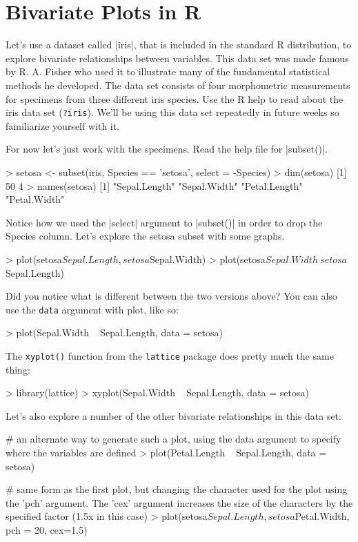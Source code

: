 \section{Bivariate Plots in R}


Let's use a dataset called |iris|, that is included in the standard R distribution, to explore bivariate relationships between variables. This data set was made famous by R. A. Fisher who used it to illustrate many of the fundamental statistical methods he developed. The data set consists of four morphometric measurements for specimens from three different iris species. Use the R help to read about the iris data set (\lstinline!?iris!). We'll be using this data set repeatedly in future weeks so familiarize yourself with it.
%

For now let's just work with the  specimens. Read the help file for |subset()|.
\begin{R}
> setosa <- subset(iris, Species == 'setosa', select = -Species)
> dim(setosa)
[1] 50  4
> names(setosa)
[1] "Sepal.Length" "Sepal.Width"  "Petal.Length" "Petal.Width"
\end{R}
Notice how we used the |select| argument to |subset()| in order to drop the Species column. Let's explore the setosa subset with some graphs.
%
\begin{R}
> plot(setosa$Sepal.Length, setosa$Sepal.Width)
> plot(setosa$Sepal.Width ~ setosa$Sepal.Length)
\end{R}
Did you notice what is different between the two versions above? You can
also use the \lstinline!data! argument with plot, like so:
\begin{R}
> plot(Sepal.Width ~ Sepal.Length, data = setosa)
\end{R}
The \lstinline!xyplot()! function from the \lstinline!lattice! package
does pretty much the same thing:
%
\begin{R}
> library(lattice)
> xyplot(Sepal.Width ~ Sepal.Length, data = setosa)
\end{R}

Let's also explore a number of the other bivariate relationships in this data set:
%
\begin{R}
# an alternate way to generate such a plot, using the data argument to specify where the variables are defined
> plot(Petal.Length ~ Sepal.Length, data = setosa)

# same form as the first plot, but changing the character used for the plot using the 'pch' argument. The 'cex' argument increases the size of the characters by the specified factor (1.5x in this case)
> plot(setosa$Sepal.Length, setosa$Petal.Width, pch = 20, cex=1.5)
\end{R}


